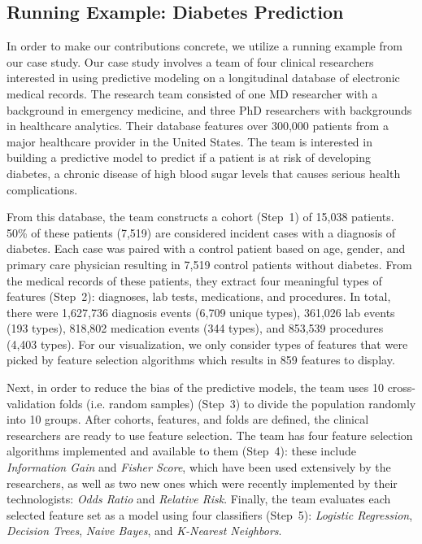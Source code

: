 \subsection{Running Example: Diabetes Prediction}
\label{sec:running_example}
In order to make our contributions concrete, we
utilize a running example from our case study.
Our case study involves a team of four clinical researchers interested
in using predictive modeling on a longitudinal database of
electronic medical records. The research team consisted of one MD researcher with a background in emergency medicine, and three PhD researchers with backgrounds in healthcare analytics.
Their database features over 300,000 patients from a major
healthcare provider in the United States.
The team is interested in building a predictive model to predict if a patient
is at risk of developing diabetes, a chronic disease of high blood sugar levels
that causes serious health complications.

From this database, the team constructs
a cohort (Step~1) of 15,038 patients.
50\% of these patients (7,519) are considered
incident cases with a diagnosis of diabetes.
Each case was paired with a control patient based on
age, gender, and primary care physician resulting
in 7,519 control patients without diabetes.
From the medical records of these patients,
they extract four meaningful types of features (Step~2): diagnoses,
lab tests, medications, and procedures.
In total, there were 1,627,736 diagnosis events (6,709 unique types), 361,026 lab events (193 types), 818,802 medication events (344 types), and 853,539 procedures (4,403 types).
For our visualization, we only consider types of features that were picked
by feature selection algorithms which results in 859 features to display.

Next, in order to reduce the bias of the predictive models,
the team uses 10 cross-validation folds (i.e. random samples) (Step~3) to divide the
population randomly into 10 groups.
After cohorts, features, and folds are defined, the
clinical researchers are ready to use feature selection.
The team has four feature selection algorithms implemented
and available to them (Step~4): these include \textit{Information Gain}
and \textit{Fisher Score}, which have been used extensively by the researchers,
as well as two new ones which were recently implemented by
their technologists: \textit{Odds Ratio} and \textit{Relative Risk}.
Finally, the team evaluates each selected feature set as a model using
four classifiers (Step~5): \textit{Logistic Regression}, \textit{Decision Trees},
\textit{Naive Bayes}, and \textit{K-Nearest Neighbors}.


